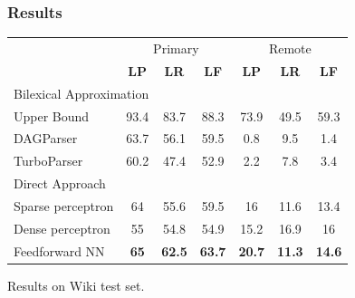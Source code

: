 \documentclass[t,handout,xcolor={svgnames}]{beamer}
\begin{document}
\begin{frame}
\frametitle{Results}
\begin{center}
	\begin{tabular}{l|ccc|ccc}
	& \multicolumn{3}{c|}{Primary} & \multicolumn{3}{c}{Remote} \\
	& \textbf{LP} & \textbf{LR} & \textbf{LF} & \textbf{LP} & \textbf{LR} & \textbf{LF} \\
	\hline
	\multicolumn{4}{l}{\rule{0pt}{2ex} \footnotesize Bilexical Approximation} \\
	Upper Bound %
	& 93.4 & 83.7 & 88.3 & 73.9 & 49.5 & 59.3 \vspace{.1cm} \\
	DAGParser
	& 63.7 & 	56.1	 & 59.5	 & 0.8	 & 9.5	 &  1.4 \\
	TurboParser
	& 60.2	 & 47.4	 & 52.9	 & 2.2	 & 7.8	 &  3.4 \\
	\hline
	\multicolumn{4}{l}{\rule{0pt}{2ex} \footnotesize Direct Approach} \\
	Sparse perceptron
	& 64 & 55.6 & 59.5 & 16 & 11.6 & 13.4 \\
	Dense perceptron
	& 55 & 54.8 & 54.9 & 15.2 & 16.9 & 16 \\
	Feedforward NN
	& {\bf 65} & {\bf 62.5} & {\bf 63.7} & {\bf 20.7} & {\bf 11.3} & {\bf 14.6}
	\end{tabular}
\end{center}

Results on Wiki test set.
\end{frame}
\end{document}
